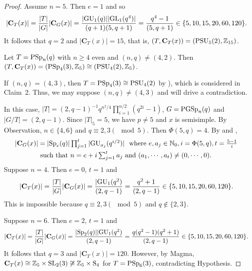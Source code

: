\documentclass[12pt,reqno]{amsart}
\def\C{\mathbf{C}}   \newcommand\Cay{\mathrm{Cay}}   \newcommand\Cos{\mathrm{Cos}} \newcommand{\CGammaSp}{\mathrm{C\Gamma Sp}}
\numberwithin {equation} {section}
\begin{document}
\begin{proof}
Assume $n=5$. Then $e =1$ and so
\[  |\C_T(x)|=\frac{|T|}{|G|}|\C_G(x)|=\frac{|\GU_1(q)||\GL_1(q^4)|}{(q+1)(5,q+1)}=\frac{q^4-1}{(5,q+1)}\in \{5,10,15,20,60,120 \}.\]
It follows that $q=2$ and $|\C_T(x)|=15$, that is, $(T,\C_T(x))=(\PSU_5(2),\ZZ_{15})$.


%
%



 \smallskip

 Let $T=\mathrm{PSp}_{n}(q)$ with $n\geq 4$ even and $(n,q) \neq (4,2)  $.  Then   $(T,\C_T(x))=(\PSp_4(3),\ZZ_5)\cong (\PSU_4(2),\ZZ_5) $.  \label{psp}

If $(n,q)=(4,3)$, then $T=\mathrm{PSp}_4(3) \cong \mathrm{PSU}_4(2)$ by \cite[Proposition 2.9.1]{K-Lie}), which is considered in Claim~2. Thus, we may suppose $(n,q) \neq (4,3)$ and will drive a contradiction.

In this case,  $|T|= (2,q-1)^{-1}q^{n^2/4}\prod_{i=1}^{n/2}(q^{2i}-1)$, $G=\mathrm{PGSp}_n(q)$ and $|G/T|=(2,q-1)$.  Since $|T|_5=5$, we have $p\neq 5$ and $x$ is semisimple. By Observation, $n \in \{4,6\}$ and $q \equiv 2,3 (\mod 5)$. Then $\Phi(5,q)=4$. By \cite[Table B.7]{B-G} and \cite[Proposition 3.4.3 (ii)]{B-G},
 \begin{equation}\label{eq:psp}
 \begin{split}
 \textstyle |\C_G(x)|&  =\textstyle{ |\Sp_e(q)|\prod_{j=1}^{t}|\GU_{a_j}(q^{i/2})|}  ~\text{~where~} e,a_j \in \mathbb{N}_0, i=\Phi(5,q),   \textstyle{t=\frac{5-1}{i}}\\
  & \text{~such~that~} \textstyle{n=e+i\sum_{j=1}^{t}a_j} \text{~and~} (a_1,\cdots,a_t) \neq (0,\cdots,0).
\end{split}
 \end{equation}
Suppose $n=4$. Then $e=0$, $t=1$ and
\[ |\C_T(x)|=\frac{|T|}{|G|}|\C_G(x)|=\frac{|\GU_{1} (q^{2})}{(2,q-1)}=\frac{ q^2+1 }{(2,q-1)}\in \{5,10,15,20,60,120 \}.\]
This is impossible because $q \equiv 2,3 (\mod 5)$ and $q \notin \{2,3\}$.

Suppose $n=6$. Then $e=2$, $t=1$ and
\[ |\C_T(x)|=\frac{|T|}{|G|}|\C_G(x)|=\frac{|\Sp_2(q)||\GU_{1} (q^{2})}{(2,q-1)}=\frac{ q(q^2-1)(q^2+1) }{(2,q-1)}\in \{5,10,15,20,60,120 \}.\]
It follows that $q=3$ and $|\C_T(x)|=120$. However, by {\sc Magma}, $\C_{T}(x)\cong\ZZ_5 \times \SL_2(3) \not\cong \ZZ_5 \times \Sy_4$ for $T=\mathrm{PSp}_6(3)$, contradicting Hypothesis.




\end{proof}
\end{document}
